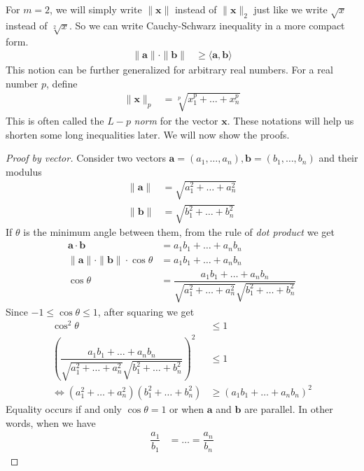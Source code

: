 \documentclass{subfile}
\begin{document}
	For $m=2$, we will simply write $\|\mathbf{x}\|$ instead of $\|\mathbf{x}\|_2$ just like we write $\sqrt{x}$ instead of $\sqrt[2]{x}$. So we can write Cauchy-Schwarz inequality in a more compact form.
		\begin{align*}
			\|\mathbf{a}\|\cdot\|\mathbf{b}\|
				& \geq\langle\mathbf{a},\mathbf{b}\rangle
		\end{align*}
	This notion can be further generalized for arbitrary real numbers. For a real number $p$, define
		\begin{align*}
			\|\mathbf{x}\|_p
				& = \sqrt[p]{x_1^p+\ldots+x_n^p}
		\end{align*}
	This is often called the $L-p$ \textit{norm} for the vector $\mathbf{x}$. These notations will help us shorten some long inequalities later. We will now show the proofs.
		\begin{proof}[Proof by vector]
			Consider two vectors $\mathbf{a}=(a_1,\ldots,a_n),\mathbf{b}=(b_1,\ldots,b_n)$ and their modulus
				\begin{align*}
					\|\mathbf{a}\|
						& = \sqrt{a_1^2+\ldots+a_n^2}\\
					\|\mathbf{b}\|
						& = \sqrt{b_1^2+\ldots+b_n^2}
				\end{align*}
			If $\theta$ is the minimum angle between them, from the rule of \textit{dot product} we get
				\begin{align*}
					\mathbf{a}\cdot\mathbf{b}
						& = a_1b_1+\ldots+a_nb_n\\
					\|\mathbf{a}\|\cdot\|\mathbf{b}\|\cdot\cos\theta
						& = a_1b_1+\ldots+a_nb_n\\
					\cos{\theta}
						& = \dfrac{a_1b_1+\ldots+a_nb_n}{\sqrt{a_1^2+\ldots+a_n^2}\sqrt{b_1^2+\ldots+b_n^2}}
				\end{align*}
			Since $-1\leq\cos\theta\leq1$, after squaring we get
				\begin{align*}
					\cos^2\theta
						& \leq1\\
					\left(\dfrac{a_1b_1+\ldots+a_nb_n}{\sqrt{a_1^2+\ldots+a_n^2}\sqrt{b_1^2+\ldots+b_n^2}}\right)^2
						& \leq1\\
					\iff (a_1^2+\ldots+a_n^2)(b_1^2+\ldots+b_n^2)
						& \geq(a_1b_1+\ldots+a_nb_n)^2
				\end{align*}
			Equality occurs if and only $\cos\theta=1$ or when $\mathbf{a}$ and $\mathbf{b}$ are parallel. In other words, when we have
				\begin{align*}
					\dfrac{a_1}{b_1}& = \ldots=\dfrac{a_n}{b_n}
				\end{align*}
		\end{proof}
	
\end{document}
